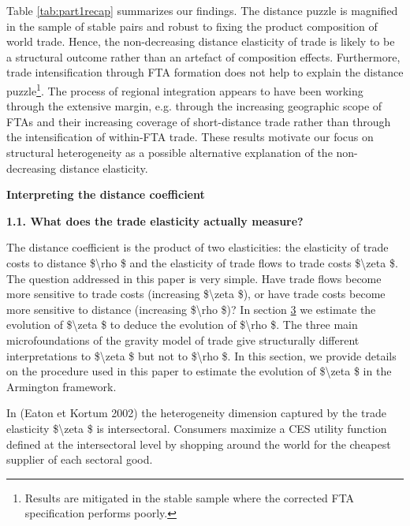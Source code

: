 \documentclass[12pt,twoside,a4paper,notitlepage]{article}
\newcommand{\revLA}[1]{\textcolor{red}{\footnotesize\textit{{revLA: #1}}}} %
\def\revLA #1{} %
\begin{document}
Table \ref{tab:part1recap} summarizes our findings. The distance puzzle is magnified in the sample of stable pairs and robust to fixing the product composition of world trade. Hence, the non-decreasing distance elasticity of trade is likely to be a structural outcome rather than an artefact of composition effects. 
Furthermore, trade intensification through FTA formation does not help to explain the distance puzzle\footnote{Results are mitigated in the stable sample where the corrected FTA specification performs poorly.}. The process of regional integration appears to have been working through the extensive margin, e.g. through the increasing geographic scope of FTAs and their increasing coverage of short-distance trade rather than through the intensification of within-FTA trade.
\fi
These results motivate our focus on structural heterogeneity as a possible alternative explanation of the non-decreasing distance elasticity. 

\clearpage
\revLA{I SUPPRESS ALL OF THE FOLLOWING PARTS UNTIL REFERENCES WHICH I UPDATED AS WELL}


\textbf{ Interpreting the distance coefficient}

\textbf{1.1. What does the trade elasticity actually measure? \label{mark-1.1.}}

The distance coefficient is the product of two elasticities: the elasticity of trade costs to distance \$\textbackslash rho \$ and the elasticity of trade flows to trade costs \$\textbackslash zeta \$. The question addressed in this paper is very simple. Have trade flows become more sensitive to trade costs (increasing \$\textbackslash zeta \$), or have trade costs become more sensitive to distance (increasing \$\textbackslash rho \$)? In section {\hyperref[ref-003]{3}} we estimate the evolution of \$\textbackslash zeta \$ to deduce the evolution of \$\textbackslash rho \$. The three main microfoundations of the gravity model of trade give structurally different interpretations to \$\textbackslash zeta \$ but not to \$\textbackslash rho \$. In this section, we provide details on the procedure used in this paper to estimate the evolution of \$\textbackslash zeta \$ in the Armington framework. 

In (Eaton et Kortum 2002) the heterogeneity dimension captured by the trade elasticity \$\textbackslash zeta \$ is intersectoral. Consumers maximize a CES utility function defined at the intersectoral level by shopping around the world for the cheapest supplier of each sectoral good.
\end{document}
